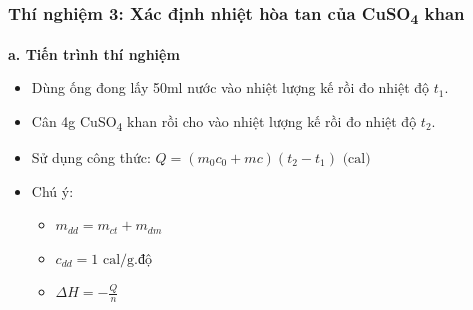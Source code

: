 \subsubsection{Thí nghiệm 3: Xác định nhiệt hòa tan của CuSO\textsubscript{4} khan}
\textbf{a. Tiến trình thí nghiệm}
\begin{itemize}
    \item Dùng ống đong lấy 50ml nước vào nhiệt lượng kế rồi đo nhiệt độ $t_1$.
    \item Cân 4g CuSO\textsubscript{4} khan rồi cho vào nhiệt lượng kế rồi đo nhiệt độ $t_2$.
    \item Sử dụng công thức: $Q = (m_0c_0 + mc)(t_2 - t_1) \text{ (cal)}$
    \item Chú ý:
    \begin{itemize}
        \item $m_{dd} = m_{ct} + m_{dm}$
        \item $c_{dd} = 1 \text{ cal/g.độ}$
        \item $\Delta H = -\frac{Q}{n}$
    \end{itemize}
\end{itemize}

